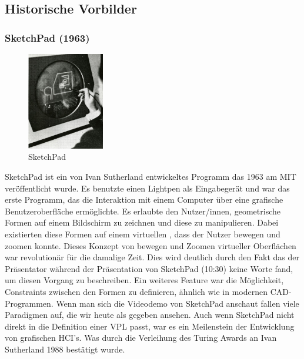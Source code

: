 \documentclass[ngerman]{article}
\begin{document}
\subsection{Historische Vorbilder}

\subsubsection{SketchPad (1963)}
\label{sec:SketchPad}
\begingroup
\setlength\intextsep{2pt}
\begin{minipage}{\linewidth}
\begin{figure}
  \centering
  \includegraphics[width=0.3\textwidth]{./graphics/sketchpad-sutherland.jpg} %
  \caption{SketchPad \cite{sutherlandSketchpad}}
\end{figure}
SketchPad ist ein von Ivan Sutherland entwickeltes Programm das 1963 am MIT veröffentlicht wurde. 
Es benutzte einen Lightpen als Eingabegerät und war das erste Programm, das die Interaktion mit einem Computer über eine grafische Benutzeroberfläche ermöglichte. 
Es erlaubte den Nutzer/innen, geometrische Formen auf einem Bildschirm zu zeichnen und diese zu manipulieren.
  Dabei existierten diese Formen auf einem virtuellen , dass der Nutzer bewegen und zoomen konnte. Dieses Konzept von bewegen und Zoomen virtueller Oberflächen war revolutionär für die damalige Zeit.
  Dies wird deutlich durch den Fakt das der Präsentator während der Präsentation von SketchPad \cite{sketchpadDemo} (10:30) keine Worte fand, um diesen Vorgang zu beschreiben.
Ein weiteres Feature war die Möglichkeit, Constraints zwischen den Formen zu definieren, ähnlich wie in modernen CAD-Programmen. 
Wenn man sich die Videodemo von SketchPad anschaut fallen viele Paradigmen auf, die wir heute als gegeben ansehen.
\br
Auch wenn SketchPad nicht direkt in die Definition einer VPL passt, war es ein Meilenstein der Entwicklung von grafischen HCI's. Was durch die Verleihung des Turing Awards an Ivan Sutherland 1988 bestätigt wurde.
\end{minipage}
\endgroup
\end{document}
